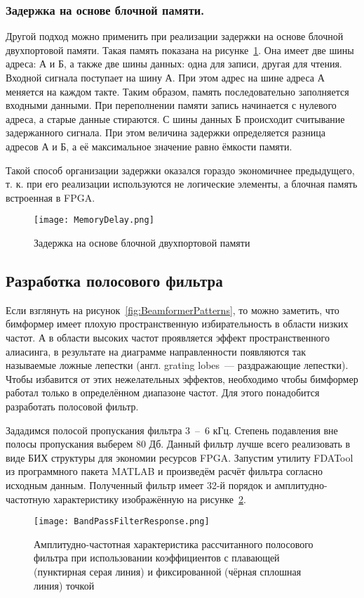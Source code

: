 \subsubsection{Задержка на основе блочной памяти. }
Другой подход можно применить при реализации задержки на основе блочной двухпортовой памяти. Такая память показана на рисунке~\ref{fig:MemoryDelay}. Она имеет две шины адреса: А и Б, а также две шины данных: одна для записи, другая для чтения. Входной сигнала поступает на шину А. При этом адрес на шине адреса А меняется на каждом такте. Таким образом, память последовательно заполняется входными данными. При переполнении памяти запись начинается с нулевого адреса, а старые данные стираются. С шины данных Б происходит считывание задержанного сигнала. При этом величина задержки определяется разница адресов А и Б, а её максимальное значение равно ёмкости памяти.

Такой способ организации задержки оказался гораздо экономичнее предыдущего, т. к. при его реализации используются не логические элементы, а блочная память встроенная в FPGA.
\begin{figure}[ht]
	\centering
	\texttt{[image: MemoryDelay.png]}  
	\caption{Задержка на основе блочной двухпортовой памяти}
	\label{fig:MemoryDelay}
\end{figure}


\subsection{Разработка полосового фильтра}
\label{section:BandPassFilterBuilding}
Если взглянуть на рисунок~\ref{fig:BeamformerPatterns}, то можно заметить, что \dands{} бимформер имеет плохую пространственную избирательность в области низких частот. А в области высоких частот проявляется эффект пространственного алиасинга, в результате на диаграмме направленности появляются так называемые ложные лепестки (англ. \foreignlanguage{english}{grating lobes}~--- раздражающие лепестки). Чтобы избавится от этих нежелательных эффектов, необходимо чтобы бимформер работал только в определённом диапазоне частот. Для этого понадобится разработать полосовой фильтр.

Зададимся полосой пропускания фильтра 3~--~6 кГц. Степень подавления вне полосы пропускания выберем 80 Дб. Данный фильтр лучше всего реализовать в виде БИХ структуры для экономии ресурсов FPGA. Запустим утилиту FDATool из программного пакета MATLAB и произведём расчёт фильтра согласно исходным данным. Полученный фильтр имеет 32-й порядок и амплитудно-частотную характеристику изображённую на рисунке~\ref{fig:BandPassFilterResponse}.
\begin{figure}[ht]
	\centering
	\texttt{[image: BandPassFilterResponse.png]}  
	\caption{Амплитудно-частотная характеристика рассчитанного полосового фильтра при использовании коэффициентов с плавающей (пунктирная серая линия) и фиксированной (чёрная сплошная линия) точкой}
	\label{fig:BandPassFilterResponse}
\end{figure}

